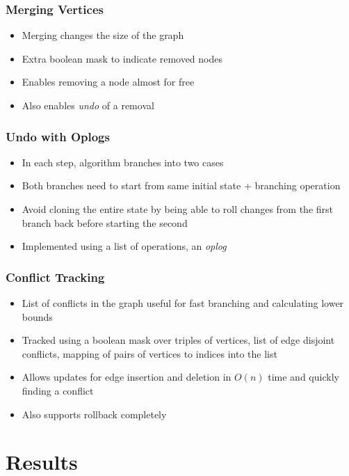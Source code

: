 \documentclass{beamer}
\begin{document}
\begin{frame}
	\frametitle{Merging Vertices}
	\begin{itemize}
		\item Merging changes the size of the graph
		\item Extra boolean mask to indicate removed nodes
		\item Enables removing a node almost for free
		\item Also enables \emph{undo} of a removal
	\end{itemize}
\end{frame}

\begin{frame}
	\frametitle{Undo with Oplogs}
	\begin{itemize}
		\item In each step, algorithm branches into two cases
		\item Both branches need to start from same initial state + branching operation
		\item Avoid cloning the entire state by being able to roll changes from the first branch
			back before starting the second
		\item Implemented using a list of operations, an \emph{oplog}
	\end{itemize}
\end{frame}

\begin{frame}
	\frametitle{Conflict Tracking}
	\begin{itemize}
		\item List of conflicts in the graph useful for fast branching and calculating lower bounds
		\item Tracked using a boolean mask over triples of vertices, list of edge disjoint
			conflicts, mapping of pairs of vertices to indices into the list
		\item Allows updates for edge insertion and deletion in $O(n)$ time and quickly finding a
			conflict
		\item Also supports rollback completely
	\end{itemize}
\end{frame}

\section{Results}
\end{document}
